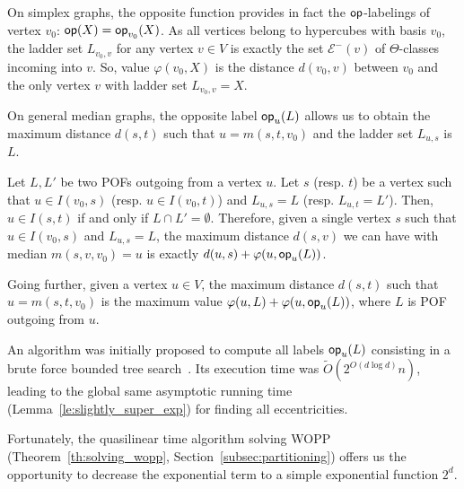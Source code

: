\documentclass[a4paper,UKenglish,numberwithinsect,cleveref, autoref]{lipics-v2021}
\newcommand{\opp}{\mbox{\textsf{op}}}
\begin{document}
On simplex graphs, the opposite function provides in fact the $\opp$-labelings of vertex $v_0$: $\opp(X) = \opp_{v_0}(X)$. As all vertices belong to hypercubes with basis $v_0$, the ladder set $L_{v_0,v}$ for any vertex $v\in V$ is exactly the set $\mathcal{E}^-(v)$ of $\Theta$-classes incoming into $v$. So, value $\varphi(v_0,X)$ is the distance $d(v_0,v)$ between $v_0$ and the only vertex $v$ with ladder set $L_{v_0,v} = X$.

On general median graphs, the opposite label $\opp_u(L)$ allows us to obtain the maximum distance $d(s,t)$ such that $u = m(s,t,v_0)$ and the ladder set $L_{u,s}$ is $L$.

\begin{lemma}
Let $L,L'$ be two POFs outgoing from a vertex $u$. Let $s$ (resp. $t$) be a vertex such that $u \in I(v_0,s)$ (resp. $u \in I(v_0,t)$) and $L_{u,s} = L$ (resp. $L_{u,t} = L'$). Then, $u \in I(s,t)$ if and only if $L \cap L' = \emptyset$. Therefore, given a single vertex $s$ such that $u \in I(v_0,s)$ and $L_{u,s} = L$, the maximum distance $d(s,v)$ we can have with median $m(s,v,v_0) = u$ is exactly $d(u,s)+\varphi(u,\opp_u(L))$.
\label{le:property_opp}
\end{lemma}

Going further, given a vertex $u \in V$, the maximum distance $d(s,t)$ such that $u = m(s,t,v_0)$ is the maximum value $\varphi(u,L) + \varphi(u,\opp_u(L))$, where $L$ is POF outgoing from $u$.

An algorithm was initially proposed to compute all labels $\opp_u(L)$ consisting in a brute force bounded tree search~\cite{BeHa21}. Its execution time was $\tilde{O}(2^{O(d\log d)}n)$, leading to the global same asymptotic running time (Lemma~\ref{le:slightly_super_exp}) for finding all eccentricities.

Fortunately, the quasilinear time algorithm solving WOPP (Theorem~\ref{th:solving_wopp}, Section~\ref{subsec:partitioning}) offers us the opportunity to decrease the exponential term to a simple exponential function $2^d$.
\end{document}
